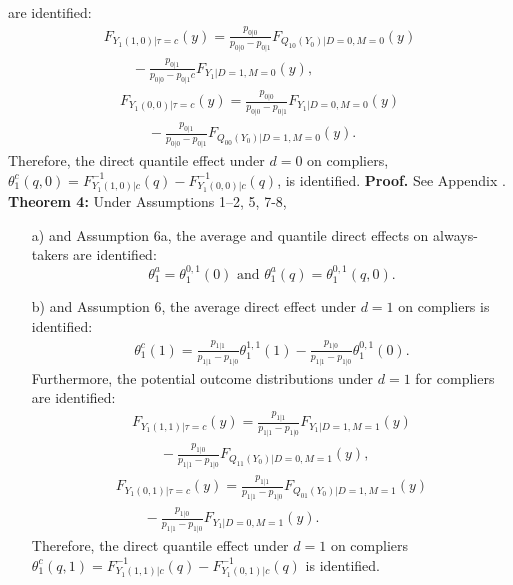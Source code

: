 \documentclass[a4paper,12pt]{article}
\begin{document}
 \doublespacing \pagestyle{plain}
are identified:
\begin{equation} \begin{array}{rl} \displaystyle
 F_{Y_{1}(1,0)|\tau=c}(y) = \displaystyle \frac{p_{0|0}}{p_{0|0} - p_{0|1}}  F_{Q_{10}(Y_{0})|D=0,M=0}(y) \\ \displaystyle \qquad - \frac{p_{0|1}}{ p_{0|0} - p_{0|1}c}  F_{Y_1|D=1,M=0}(y), \end{array}
 \end{equation}
 \begin{equation}
 \begin{array}{rl}\displaystyle
F_{Y_{1}(0,0)|\tau=c}(y) = \displaystyle \frac{p_{0|0}}{p_{0|0} - p_{0|1}} F_{Y_{1}|D=0,M=0}(y) \\ \displaystyle \qquad - \frac{p_{0|1} }{p_{0|0} - p_{0|1}}F_{Q_{00}(Y_{0})|D=1,M=0}(y)  . 
\end{array}
\end{equation}
Therefore, the direct quantile effect under $d = 0$ on compliers, $\theta_1^{c}(q,0) = F_{Y_{1}(1,0)|c}^{-1}(q)-F_{Y_{1}(0,0)|c}^{-1}(q)$, is identified.
\textbf{Proof.} See Appendix .
\noindent \textbf{Theorem 4:} Under Assumptions 1–2, 5, 7-8,
\begin{itemize}
\item[a)] and Assumption 6a, the average and quantile direct effects on
always-takers are identified:
\begin{equation*}
\theta_1^a= \theta_1^{0,1}(0) \mbox{ and } \theta_1^a(q)= \theta_1^{0,1}(q,0).
\end{equation*}
\item[b)] and Assumption 6, the average direct effect under $d = 1$ on compliers is identified:
\begin{align*}
\theta_{1}^{c}(1) = \frac{p_{1|1}}{ p_{1|1} - p_{1|0}} \theta_1^{1,1}(1) -\frac{p_{1|0}}{p_{1|1} - p_{1|0}}\theta_1^{0,1}(0).
\end{align*}
Furthermore, the potential outcome distributions under $d = 1$ for compliers are identified:
\begin{equation} \begin{array}{rl} \displaystyle
 F_{Y_{1}(1,1)|\tau=c}(y) = \displaystyle \frac{p_{1|1}}{p_{1|1} - p_{1|0}} F_{Y_{1}|D=1,M=1}(y) \\ \displaystyle \qquad - \frac{p_{1|0} }{p_{1|1} - p_{1|0}}F_{Q_{11}(Y_0)|D=0,M=1}(y),  \end{array}
 \end{equation}
 \begin{equation}
 \begin{array}{rl}\displaystyle
F_{Y_{1}(0,1)|\tau=c}(y) =\displaystyle \frac{p_{1|1}}{p_{1|1} - p_{1|0}}  F_{Q_{01}(Y_{0})|D=1,M=1}(y)\\  \displaystyle \qquad - \frac{p_{1|0}}{ p_{1|1} - p_{1|0}}  F_{Y_1|D=0,M=1}(y).  \end{array}
\end{equation}
Therefore, the direct quantile effect under $d = 1$ on compliers $\theta_1^{c}(q,1) = F_{Y_{1}(1,1)|c}^{-1}(q)-F_{Y_{1}(0,1)|c}^{-1}(q)$ is identified.
\end{itemize}
\end{document}
